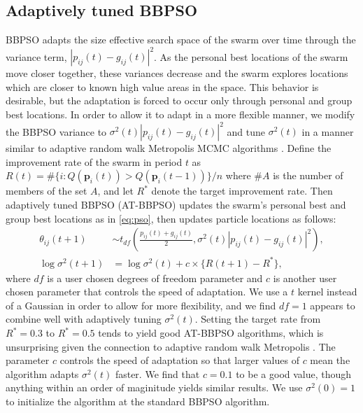 \documentclass[12pt]{article}
\begin{document}
\subsection{Adaptively tuned BBPSO}\label{subsec:ATBBPSO}
BBPSO adapts the size effective search space of the swarm over time through the variance term, $|p_{ij}(t) - g_{ij}(t)|^2$. As the personal best locations of the swarm move closer together, these variances decrease and the swarm explores locations which are closer to known high value areas in the space. This behavior is desirable, but the adaptation is forced to occur only through personal and group best locations. In order to allow it to adapt in a more flexible manner, we modify the BBPSO variance to $\sigma^2(t)|p_{ij}(t) - g_{ij}(t)|^2$ and tune $\sigma^2(t)$ in a manner similar to adaptive random walk Metropolis MCMC algorithms \citep{andrieu2008tutorial}. Define the improvement rate of the swarm in period $t$ as $R(t) = \#\{i:Q(\bm{p}_i(t))> Q(\bm{p}_i(t-1))\}/n$ where $\#A$ is the number of members of the set $A$, and let $R^*$ denote the target improvement rate. Then adaptively tuned BBPSO (AT-BBPSO) updates the swarm's personal best and group best locations as in \eqref{eq:pso}, then updates particle locations as follows:
\begin{align}\label{eq:at-bbpso}
\theta_{ij}(t+1) &\sim t_{df}\left(\frac{p_{ij}(t) + g_{ij}(t)}{2}, \sigma^2(t)|p_{ij}(t) - g_{ij}(t)|^2\right),\nonumber\\
\log \sigma^2(t+1) &= \log\sigma^2(t) + c\times\{R(t+1) - R^*\},
\end{align}
where $df$ is a user chosen degrees of freedom parameter and $c$ is another user chosen parameter that controls the speed of adaptation. We use a $t$ kernel instead of a Gaussian in order to allow for more flexibility, and we find $df=1$ appears to combine well with adaptively tuning $\sigma^2(t)$. Setting the target rate from $R^*=0.3$ to $R^*=0.5$ tends to yield good AT-BBPSO algorithms, which is unsurprising given the connection to adaptive random walk Metropolis \citep{gelman1996efficient}. The parameter $c$ controls the speed of adaptation so that larger values of $c$ mean the algorithm adapts $\sigma^2(t)$ faster. We find that $c=0.1$ to be a good value, though anything within an order of maginitude yields similar results. We use $\sigma^2(0)=1$ to initialize the algorithm at the standard BBPSO algorithm.
\end{document}

